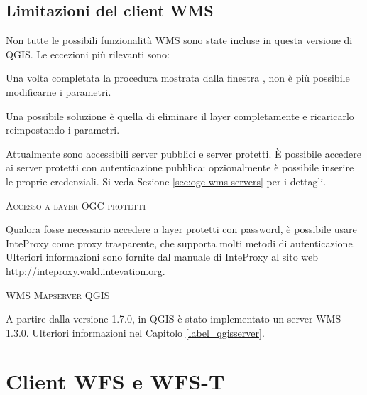 \subsection{Limitazioni del client WMS}\label{sec:ogc-wms-limits}

Non tutte le possibili funzionalità WMS sono state incluse in questa versione di QGIS. Le eccezioni
più rilevanti sono:


Una volta completata la procedura mostrata dalla finestra
, non è più possibile
modificarne i parametri.

Una possibile soluzione è quella di eliminare il layer completamente e
ricaricarlo reimpostando i parametri.


Attualmente sono accessibili server pubblici e server protetti. È possibile accedere ai server protetti 
con autenticazione pubblica: opzionalmente è possibile inserire le proprie credenziali.
Si veda Sezione \ref{sec:ogc-wms-servers} per i dettagli.

\begin{Tip}[ht]\caption{\textsc{Accesso a layer OGC protetti}}
Qualora fosse necessario accedere a layer protetti con password, è
possibile usare InteProxy come proxy trasparente, che supporta molti metodi
di autenticazione. Ulteriori informazioni sono fornite dal manuale di
InteProxy al sito web \url{http://inteproxy.wald.intevation.org}.
\end{Tip}

\begin{Tip}[ht]\caption{\textsc{WMS Mapserver QGIS}}
A partire dalla versione 1.7.0, in QGIS è stato implementato un server WMS 1.3.0. 
Ulteriori informazioni nel Capitolo \ref{label_qgisserver}.
\end{Tip}

\section{Client WFS e WFS-T}\label{sec:ogc-wfs}

